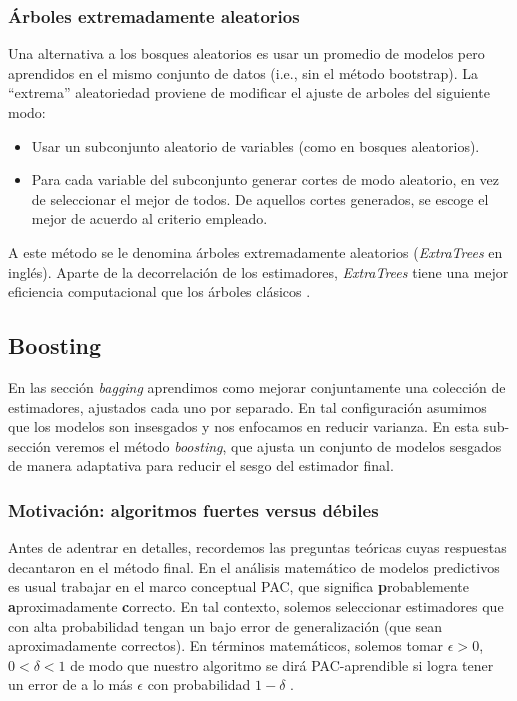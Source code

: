 \subsubsection{Árboles extremadamente aleatorios}

Una alternativa a los bosques aleatorios es usar un promedio de modelos pero aprendidos en el mismo conjunto de datos (i.e., sin el método bootstrap). La ``extrema'' aleatoriedad proviene de modificar el ajuste de arboles del siguiente modo:
\begin{itemize}
    \item Usar un subconjunto aleatorio de variables (como en bosques aleatorios).
    \item Para cada variable del subconjunto generar cortes de modo aleatorio, en vez de seleccionar el mejor de todos. De aquellos cortes generados, se escoge el mejor de acuerdo al criterio empleado.
\end{itemize}
A este método se le denomina árboles extremadamente aleatorios (\textit{ExtraTrees} en inglés). Aparte de la decorrelación de los estimadores, \textit{ExtraTrees} tiene una mejor eficiencia computacional que los árboles clásicos \cite{geurts2006extremely}.


\subsection{Boosting}
\label{sec:boosting}

En las sección \textit{bagging} aprendimos como mejorar conjuntamente una colección de estimadores, ajustados cada uno por separado. En tal configuración asumimos que los modelos son insesgados y nos enfocamos en reducir varianza. En esta sub-sección veremos el método \textit{boosting}, que ajusta un conjunto de modelos sesgados de manera adaptativa para reducir el sesgo del estimador final.

\subsubsection{Motivación: algoritmos fuertes versus débiles}

Antes de adentrar en detalles, recordemos las preguntas teóricas cuyas respuestas decantaron en el método final. En el análisis matemático de modelos predictivos es usual trabajar en el marco conceptual PAC, que significa \textbf{p}robablemente \textbf{a}proximadamente \textbf{c}orrecto. En tal contexto, solemos seleccionar estimadores que con alta probabilidad tengan un bajo error de generalización (que sean aproximadamente correctos). En términos matemáticos, solemos tomar $\epsilon > 0$, $0 < \delta < 1$ de modo que nuestro algoritmo se dirá PAC-aprendible si logra tener un error de a lo más $\epsilon$ con probabilidad $1-\delta$ \cite{schapire2012boosting}.

